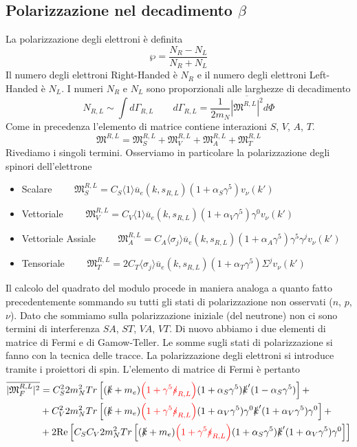 \subsection{Polarizzazione nel decadimento $\beta$}
La polarizzazione degli elettroni è definita
$$
\wp = \frac{N_R - N_L}{N_R + N_L}
$$
Il numero degli elettroni Right-Handed è $N_R$ e il numero degli elettroni Left-Handed è $N_L$. I numeri $N_R$ e $N_L$ sono proporzionali alle larghezze di decadimento
$$
N_{R,L} \sim \int d\Gamma_{R,L} \qquad d\Gamma_{R,L} = \frac{1}{2m_N} \overline{|\mathfrak{M}^{R,L}|^2} d\Phi
$$
Come in precedenza l'elemento di matrice contiene interazioni $S$, $V$, $A$, $T$.
$$
\mathfrak{M}^{R,L} = \mathfrak{M}_S^{R,L} + \mathfrak{M}_V^{R,L} + \mathfrak{M}_A^{R,L} + \mathfrak{M}_T^{R,L}
$$
Rivediamo i singoli termini. Osserviamo in particolare la polarizzazione degli spinori dell'elettrone
\begin{itemize}
	\item Scalare $\qquad\mathfrak{M}_S^{R,L} = C_S \langle 1 \rangle \overline{u}_e(k, s_{R,L}) (1 + \alpha_S \gamma^5) v_\nu(k') $
	\item Vettoriale $\qquad\mathfrak{M}_V^{R,L} = C_V \langle 1 \rangle \overline{u}_e(k, s_{R,L}) (1 + \alpha_V \gamma^5) \gamma^0 v_\nu(k') $
	\item Vettoriale Assiale $ \qquad\mathfrak{M}_A^{R,L} = C_A \langle \sigma_j \rangle \overline{u}_e(k, s_{R,L}) (1 + \alpha_A \gamma^5) \gamma^5 \gamma^j v_\nu(k')$
	\item Tensoriale $\qquad \mathfrak{M}_T^{R,L} = 2C_T \langle \sigma_j \rangle \overline{u}_e(k, s_{R,L}) (1 + \alpha_T \gamma^5) \Sigma^j v_\nu(k')$
\end{itemize}
Il calcolo del quadrato del modulo procede in maniera analoga a quanto fatto precedentemente sommando su tutti gli stati di polarizzazione non osservati ($n$, $p$, $\nu$). Dato che sommiamo sulla polarizzazione iniziale (del neutrone) non ci sono termini di interferenza $SA$, $ST$, $VA$, $VT$. Di nuovo abbiamo i due elementi di matrice di Fermi e di Gamow-Teller. Le somme sugli stati di polarizzazione si fanno con la tecnica delle tracce. La polarizzazione degli elettroni si introduce tramite i proiettori di spin. L'elemento di matrice di Fermi è pertanto
$$
\begin{aligned}
	\overline{|\mathfrak{M}_F^{R,L}|^2} &= C_S^2 2m_N^2 Tr \left[ (\slashed{k} + m_e) \textcolor{red}{\left(1 + \gamma^5 \slashed{s}_{R,L}\right)} (1 + \alpha_S \gamma^5) \slashed{k}' (1 - \alpha_S \gamma^5) \right] + \\
	&+ C_V^2 2m_N^2 Tr \left[ (\slashed{k} + m_e) \textcolor{red}{\left(1 + \gamma^5 \slashed{s}_{R,L}\right)} (1 + \alpha_V \gamma^5) \gamma^0 \slashed{k}' (1 + \alpha_V \gamma^5) \gamma^0 \right] + \\
	&+ 2 \text{Re} \left[ C_S C_V 2m_N^2 Tr \left[ (\slashed{k} + m_e) \textcolor{red}{\left(1 + \gamma^5 \slashed{s}_{R,L}\right)} (1 + \alpha_S \gamma^5) \slashed{k}' (1 + \alpha_V \gamma^5) \gamma^0 \right] \right]
\end{aligned}
$$

